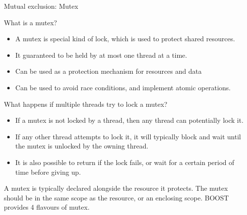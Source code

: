 \documentclass[8pt]{beamer}
\begin{document}
\begin{frame}{Mutual exclusion:  Mutex}

\begin{block}{What is a mutex?}
 
\begin{itemize}
  \item A mutex is special kind of lock, which is used to protect shared resources.
  \item It guaranteed to be held by at most one thread at a time.
  \item Can be used as a protection mechanism for resources and data
  \item Can be used to avoid race conditions, and implement atomic operations.
\end{itemize}

\end{block}

\begin{block}{What happens if multiple threads try to lock a mutex?}

\begin{itemize}
  \item If a mutex is not locked by a thread, then any thread can potentially lock it. 
  \item If any other thread attempts to lock it, it will typically block and wait until the mutex is unlocked by the owning thread.
  \item It is also possible to return if the lock fails, or wait for a certain period of time before giving up.
\end{itemize}

\end{block}

A mutex is typically declared alongside the resource it protects. The mutex should be in the same scope as the resource, or an enclosing scope. BOOST provides 4 flavours of mutex.

\end{frame}
\end{document}
